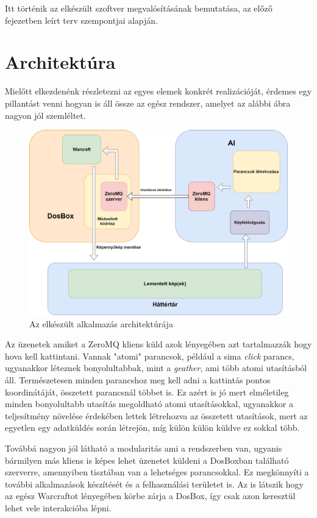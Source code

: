 
Itt történik az elkészült szoftver megvalósításának bemutatása, az előző fejezetben leírt terv szempontjai alapján.


\section{Architektúra}

Mielőtt elkezdenénk részletezni az egyes elemek konkrét realizációját, érdemes egy pillantást venni hogyan is áll össze az egész rendszer, amelyet az alábbi ábra nagyon jól szemléltet. 

\begin{figure}[h]
    \centering
    \includegraphics[scale=0.22]{images/architecture.png}
    \caption{Az elkészült alkalmazás architektúrája}
    \label{fig:rect}
\end{figure}
Az üzenetek amiket a ZeroMQ kliens küld azok lényegében azt tartalmazzák hogy hova kell kattintani. 
Vannak "atomi" parancsok, például a sima \textit{click} parancs, ugyanakkor léteznek bonyolultabbak, mint a \textit{geather}, ami több atomi utasításból áll. Természetesen minden parancshoz meg kell adni a kattintás pontos koordinátáját, összetett parancsnál többet is. Ez azért is jó mert elméletileg minden bonyolultabb utasítás megoldható atomi utasításokkal, ugyanakkor a teljesítmény növelése érdekében lettek létrehozva az összetett utasítások, mert az egyetlen egy adatküldés során létrejön, míg külön külön küldve ez sokkal több.

Továbbá nagyon jól látható a modularitás ami a rendszerben van, ugyanis bármilyen más kliens is képes lehet üzenetet küldeni a DosBoxban található szerverre, amennyiben tisztában van a lehetséges parancsokkal. Ez megkönnyíti a további alkalmazások készítését és a felhasználási területet is. Az is látszik hogy az egész Warcraftot lényegében körbe zárja a DosBox, így csak azon keresztül lehet vele interakcióba lépni. 

